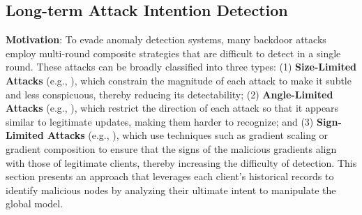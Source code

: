 \documentclass[lettersize,journal]{IEEEtran}
\begin{document}
\subsection{Long-term Attack Intention Detection}

\textbf{Motivation}: To evade anomaly detection systems, many backdoor attacks employ multi-round composite strategies that are difficult to detect in a single round. These attacks can be broadly classified into three types: (1) \textbf{Size-Limited Attacks} (e.g., \cite{geisler2024attacking, chen2024optimal}), which constrain the magnitude of each attack to make it subtle and less conspicuous, thereby reducing its detectability; (2) \textbf{Angle-Limited Attacks} (e.g., \cite{you2023three, sagliano2024powered, dong2023adaptive}), which restrict the direction of each attack so that it appears similar to legitimate updates, making them harder to recognize; and (3) \textbf{Sign-Limited Attacks} (e.g., \cite{wan2023average, zhu2023boosting}), which use techniques such as gradient scaling or gradient composition to ensure that the signs of the malicious gradients align with those of legitimate clients, thereby increasing the difficulty of detection. This section presents an approach that leverages each client's historical records to identify malicious nodes by analyzing their ultimate intent to manipulate the global model.



\end{document}
